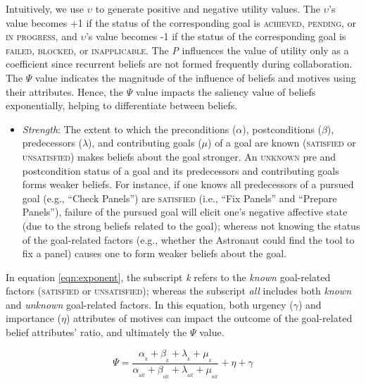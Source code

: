 \documentclass[12pt]{report}
\begin{document}
Intuitively, we use $\upsilon$ to generate positive and negative utility values.
The $\upsilon$'s value becomes +1 if the status of the corresponding goal is
\textsc{achieved}, \textsc{pending}, or \textsc{in progress}, and $\upsilon$'s
value becomes -1 if the status of the corresponding goal is \textsc{failed,
blocked}, or \textsc{inapplicable}. The \textit{P} influences the value of
utility only as a coefficient since recurrent beliefs are not formed frequently
during collaboration. The $\Psi$ value indicates the magnitude of the influence
of beliefs and motives using their attributes. Hence, the $\Psi$ value impacts
the saliency value of beliefs exponentially, helping to differentiate between
beliefs.

\begin{itemize}
  \setlength\itemsep{1mm}
  \item \textit{Strength}: The extent to which the preconditions ($\alpha$),
  postconditions ($\beta$), predecessors ($\lambda$), and contributing goals
  ($\mu$) of a goal are known (\textsc{satisfied} or \textsc{unsatisfied}) makes
  beliefs about the goal stronger. An \textsc{unknown} pre and postcondition
  status of a goal and its predecessors and contributing goals forms weaker
  beliefs. For instance, if one knows all predecessors of a pursued goal (e.g.,
  ``Check Panels'') are \textsc{satisfied} (i.e., ``Fix Panels'' and ``Prepare
  Panels''), failure of the pursued goal will elicit one's negative affective state (due
  to the strong beliefs related to the goal); whereas not knowing the status of
  the goal-related factors (e.g., whether the Astronaut could find the tool to
  fix a panel) causes one to form weaker beliefs about the goal.
\end{itemize}
In equation \ref{eqn:exponent}, the subscript \textit{k} refers to the
\textit{known} goal-related factors (\textsc{satisfied} or
\textsc{unsatisfied}); whereas the subscript \textit{all} includes both
\textit{known} and \textit{unknown} goal-related factors. In this equation, both
urgency ($\gamma$) and importance ($\eta$) attributes of motives can impact the
outcome of the goal-related belief attributes' ratio, and ultimately the $\Psi$
value.

\begin{equation}
    \Psi = \frac{\alpha_{_k} + \beta_{_k} + \lambda_{_k} +
    \mu_{_k}}{\alpha_{_{all}} + \beta_{_{all}} + \lambda_{_{all}} +
    \mu_{_{all}}} + \eta + \gamma
    \label{eqn:exponent}
\end{equation}
\end{document}
